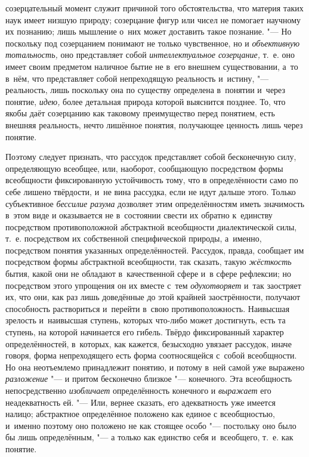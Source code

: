 созерцательный момент служит причиной того обстоятельства, что материя
таких наук имеет низшую природу; созерцание фигур или чисел не помогает
научному их познанию; лишь мышление о~них может доставить такое познание.
"--- Но поскольку под созерцанием понимают не только
чувственное, но и {\em объективную
тотальность,} оно представляет собой
{\em интеллектуальное созерцание,}
т.~е. оно имеет своим предметом наличное бытие не в~его
внешнем существовании, а~то в~нём, что представляет собой непреходящую
реальность и~истину, "--- реальность, лишь поскольку она по
существу определена в~понятии и~через понятие,
{\em идею,} более
детальная природа которой выяснится позднее. То, что якобы даёт созерцанию
как таковому преимущество перед понятием, есть внешняя реальность, нечто
лишённое понятия, получающее ценность лишь через понятие.

Поэтому следует признать, что рассудок представляет собой
бесконечную силу, определяющую всеобщее, или, наоборот, сообщающую
посредством формы всеобщности фиксированную устойчивость тому, что в
определённости само по себе лишено твёрдости, и~не вина
рассудка, если не идут дальше этого. Только субъективное
{\em бессилие разума}
дозволяет этим определённостям иметь значимость в~этом виде и
оказывается не в~состоянии свести их обратно к~единству посредством
противоположной абстрактной всеобщности диалектической силы, т.~е.
посредством их собственной специфической природы, а~именно, посредством
понятия указанных определённостей. Рассудок, правда, сообщает им
посредством формы абстрактной всеобщности, так сказать, такую
{\em жёсткость} бытия,
какой они не обладают в~качественной сфере и~в сфере рефлексии; но
посредством этого упрощения он их вместе с~тем
{\em одухотворяет} и~так
заостряет их, что они, как раз лишь доведённые до этой крайней
заострённости, получают способность раствориться и~перейти в~свою
противоположность. Наивысшая зрелость и~наивысшая ступень, которых что-либо
может достигнуть, есть та ступень, на которой начинается его гибель. Твёрдо
фиксированный характер определённостей, в~которых, как кажется, безысходно
увязает рассудок, иначе говоря, форма непреходящего есть форма
соотносящейся с~собой всеобщности. Но она неотъемлемо принадлежит понятию,
и потому в~ней самой уже выражено
{\em разложение} "--- и
притом бесконечно близкое "--- конечного. Эта всеобщность
непосредственно {\em изобличает}
определённость конечного и
{\em выражает} его
неадекватность ей. "--- Или, вернее сказать, его адекватность
уже имеется налицо; абстрактное определённое положено как единое с
всеобщностью, и~именно поэтому оно положено не как стоящее особо
"--- постольку оно было бы лишь определённым, "--- а
только как единство себя и~всеобщего, т.~е. как понятие.

